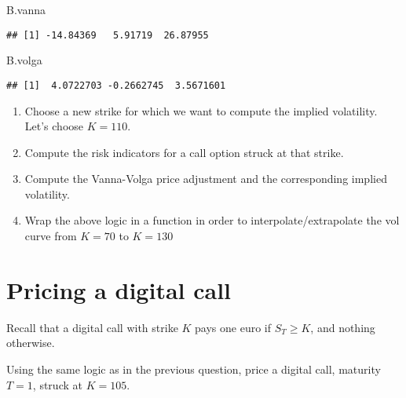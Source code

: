 \documentclass[
]{article}
\newenvironment{Shaded}{\begin{snugshade}}{\end{snugshade}}
\newcommand{\NormalTok}[1]{#1}
\begin{document}
\begin{Shaded}
\begin{Highlighting}[]
\NormalTok{B.vanna}
\end{Highlighting}
\end{Shaded}

\begin{verbatim}
## [1] -14.84369   5.91719  26.87955
\end{verbatim}

\begin{Shaded}
\begin{Highlighting}[]
\NormalTok{B.volga}
\end{Highlighting}
\end{Shaded}

\begin{verbatim}
## [1]  4.0722703 -0.2662745  3.5671601
\end{verbatim}

\begin{enumerate}
\def\labelenumi{\arabic{enumi}.}
\setcounter{enumi}{2}
\item
  Choose a new strike for which we want to compute the implied
  volatility. Let's choose \(K=110\).
\item
  Compute the risk indicators for a call option struck at that strike.
\item
  Compute the Vanna-Volga price adjustment and the corresponding implied
  volatility.
\item
  Wrap the above logic in a function in order to interpolate/extrapolate
  the vol curve from \(K=70\) to \(K=130\)
\end{enumerate}

\hypertarget{pricing-a-digital-call}{%
\section{Pricing a digital call}\label{pricing-a-digital-call}}

Recall that a digital call with strike \(K\) pays one euro if
\(S_T \geq K\), and nothing otherwise.

Using the same logic as in the previous question, price a digital call,
maturity \(T=1\), struck at \(K=105\).
\end{document}
